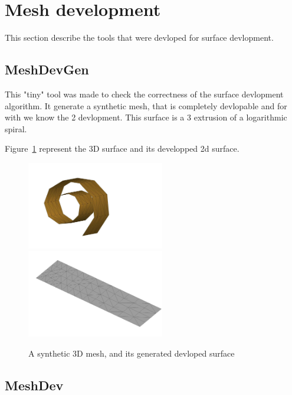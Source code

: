 
\section{Mesh development}

This section describe the tools that were devloped for surface devlopment.

\subsection{MeshDevGen}
This "tiny" tool was made to check the correctness of the surface devlopment algorithm. 
It generate a synthetic mesh, that is completely devlopable and for with we
know the 2 devlopment. This surface is a $3$ extrusion of a logarithmic spiral.

Figure~\ref{fig:SpirAndDev} represent the 3D surface and its developped 2d surface.

\begin{figure}
\centering
\includegraphics[width=6cm]{CommandReferences/ImagesComRef/Cyl3D01.jpg}
\includegraphics[width=6cm]{CommandReferences/ImagesComRef/CylDev00.jpg}
\caption{A synthetic 3D mesh, and its generated devloped surface}
\label{fig:SpirAndDev}
\end{figure}

\subsection{MeshDev}


